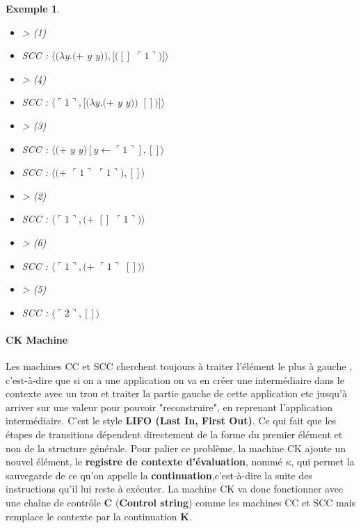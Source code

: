 \documentclass[10pt,a4paper]{report}
\newtheorem{ex}{Exemple}
\begin{document}
\begin{ex}
\begin{multicols}{2}
{				\begin{itemize}
					\item[] > (1) 
					\item[] SCC : $\langle(\lambda y.(+$ $y$ $y)),[([]$ $\ulcorner 1\urcorner)]\rangle$
					\item[] > (4)
					\item[] SCC : $\langle\ulcorner 1\urcorner,[(\lambda y.(+$ $y$ $y))$ $[])]\rangle$
					\item[] > (3) 
					\item[] SCC : $\langle(+$ $y$ $y)[y \leftarrow \ulcorner 1\urcorner],[]\rangle$	
					\item[] SCC : $\langle(+$ $\ulcorner 1\urcorner$ $\ulcorner 1\urcorner),[]\rangle$	
					\item[] > (2) 
					\item[] SCC : $\langle\ulcorner 1\urcorner,(+$ $[]$ $\ulcorner 1\urcorner)\rangle$	
					\item[] > (6) 
					\item[] SCC : $\langle\ulcorner 1\urcorner,(+$ $\ulcorner 1\urcorner$ $[])\rangle$	
					\item[] > (5)
					\item[] SCC : $\langle\ulcorner 2\urcorner,[]\rangle$	
				\end{itemize}
			}
		\end{multicols}
	\end{ex}
	\newpage
	
	
	\paragraph{CK Machine}
	
	Les machines CC et SCC cherchent toujours à traiter l'élément le plus à gauche , c'est-à-dire que si on a une application on va en créer une intermédiaire dans le contexte avec un trou et traiter la partie gauche de cette application etc jusqu'à arriver sur une valeur pour pouvoir "reconstruire", en reprenant l'application intermédiaire. C'est le style \textbf{ LIFO (Last In, First Out)}. Ce qui fait que les étapes de transitions dépendent directement de la forme du premier élément et non de la structure générale.
	\smallbreak
	Pour palier ce problème, la machine CK ajoute un nouvel élément, le \textbf{registre de contexte d'évaluation}, nommé $\kappa$, qui permet la sauvegarde de ce qu'on appelle la \textbf{continuation},c'est-à-dire la suite des instructions qu'il lui reste à exécuter.
	\smallbreak
	La machine CK va donc fonctionner avec une chaîne de contrôle \textbf{C} (\textbf{Control string}) comme les machines CC et SCC mais remplace le contexte par la continuation \textbf{K}. 
	\medbreak
	
\end{document}
